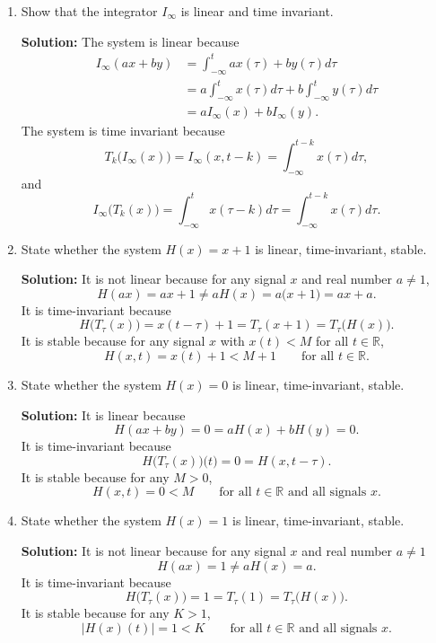 \documentclass[11pt,a4paper]{book}
\theoremstyle{plain}
\numberwithin{equation}{section}
\newcommand{\reals}{{\mathbb R}}
\newcommand{\abs}[1]{\left\vert #1 \right\vert}
\newenvironment{solution}{\begin{footnotesize}\textbf{Solution:}}{\end{footnotesize}}
\newenvironment{excersizelist}{%
  \renewcommand*{\theenumi}{\thechapter.\arabic{enumi}}%
  \newcommand\itemadvanced{\stepcounter{enumi}\item[$\ast$\, \theenumi.]}
  \begin{enumerate}
}{%
  \end{enumerate}
}
\begin{document}
\begin{excersizelist}
\item Show that the integrator $I_\infty$ is linear and time invariant.
\begin{solution}
The system is linear because
\begin{align*}
I_\infty(ax + by) &= \int_{-\infty}^t ax(\tau) + b y(\tau) d\tau \\
&= a\int_{-\infty}^t x(\tau) d\tau + b \int_{-\infty}^t y(\tau) d\tau \\
&= a I_\infty(x)  + b I_\infty(y).
\end{align*}
The system is time invariant because
\[
T_k\big(I_\infty(x)\big) = I_\infty(x,t-k) = \int_{-\infty}^{t-k} x(\tau) d\tau,
\]
and
\[
I_\infty\big(T_k(x)\big) = \int_{-\infty}^{t} x(\tau-k) d\tau = \int_{-\infty}^{t-k} x(\tau) d\tau.
\]
\end{solution}

\item State whether the system $H(x) = x + 1$ is linear, time-invariant,  stable.
\begin{solution}
It is not linear because for any signal $x$ and real number $a \neq 1$,
\[
H(ax) = ax + 1 \neq aH(x) = a\big( x + 1\big) = ax + a.
\]
It is time-invariant because
\[
H\big(T_{\tau}(x)\big) = x(t - \tau) + 1 = T_\tau(x + 1) = T_\tau\big(H(x)\big).
\]
It is  stable because for any signal $x$ with $x(t) < M$ for all $t\in\reals$, 
\[
H(x,t) = x(t) + 1 < M+1 \qquad \text{for all $t \in \reals$}. 
\]
\end{solution}

\item State whether the system $H(x) = 0$ is linear, time-invariant,  stable.
\begin{solution}
It is linear because
\[
H(ax + by) = 0 = aH(x) + bH(y) = 0.
\]
It is time-invariant because
\[
H\big(T_{\tau}(x)\big)\big(t\big) = 0 = H(x,t-\tau).
\]
It is  stable because for any $M > 0$, 
\[
H(x,t) = 0 < M \qquad \text{for all $t \in \reals$ and all signals $x$}. 
\]
\end{solution}

\item State whether the system $H(x) = 1$ is linear, time-invariant,  stable.
\begin{solution}
It is not linear because for any signal $x$ and real number $a \neq 1$
\[
H(ax) = 1 \neq  aH(x) = a.
\]
It is time-invariant because
\[
H\big(T_{\tau}(x)\big) = 1 = T_\tau(1) = T_\tau\big(H(x)\big).
\]
It is  stable because for any $K > 1$, 
\[
\abs{H(x)(t)} = 1 < K \qquad \text{for all $t \in \reals$ and all signals $x$}. 
\]
\end{solution}


\end{excersizelist}
\end{document}
